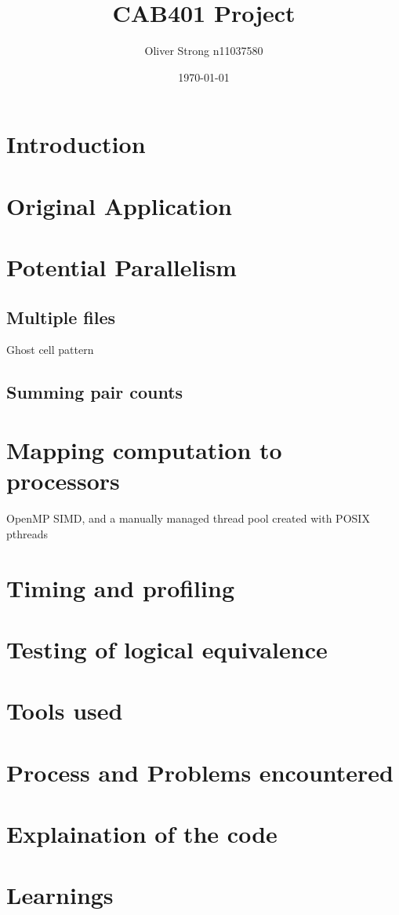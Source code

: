 \documentclass{article}
\title{CAB401 Project}
\author{Oliver Strong n11037580}
\date{\today}
\begin{document}
\maketitle
\tableofcontents
\listofalgorithms
\section{Introduction}
\section{Original Application}

\section{Potential Parallelism}
\subsection{Multiple files}
Ghost cell pattern
\subsection{Summing pair counts}


\section{Mapping computation to processors}
OpenMP SIMD, and a manually managed thread pool created with POSIX pthreads

\section{Timing and profiling}

\section{Testing of logical equivalence}

\section{Tools used}

\section{Process and Problems encountered}

\section{Explaination of the code}

\section{Learnings}
\end{document}
